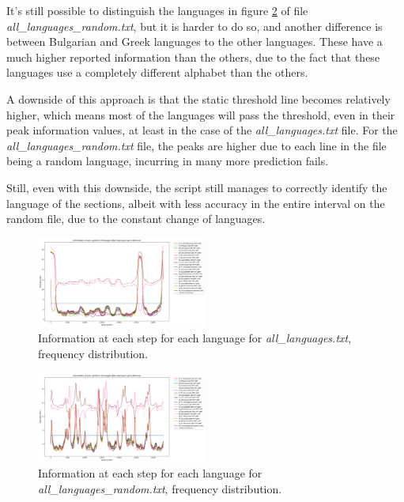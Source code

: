 \documentclass{article}
\begin{document}
It's still possible to distinguish the languages in figure \ref{fig:all_languages_random_p_f} of file \textit{all\_languages\_random.txt}, but it is harder to do so,
and another difference is between Bulgarian and Greek languages to the other languages. These have a much higher reported information than the others, due to the fact that these
languages use a completely different alphabet than the others.

A downside of this approach is that the static threshold line becomes relatively higher, which means most of the languages will pass the threshold, even in their peak information values,
at least in the case of the \textit{all\_languages.txt} file. For the \textit{all\_languages\_random.txt} file, the peaks are higher due to each line in the file being a random language, incurring in many more prediction fails.

Still, even with this downside, the script still manages to correctly identify the language of the sections, albeit with less accuracy in the entire interval on the random file,
due to the constant change of languages.

\begin{figure}
    \centering
    \includegraphics[width=0.5\textwidth]{../results/all_languages/-p_f.png}
    \caption{Information at each step for each language for \textit{all\_languages.txt}, frequency distribution.}
    \label{fig:all_languages_p_f}
\end{figure}

\begin{figure}
    \centering
    \includegraphics[width=0.5\textwidth]{../results/all_languages_random/-p_f.png}
    \caption{Information at each step for each language for \textit{all\_languages\_random.txt}, frequency distribution.}
    \label{fig:all_languages_random_p_f}
\end{figure}
\end{document}
